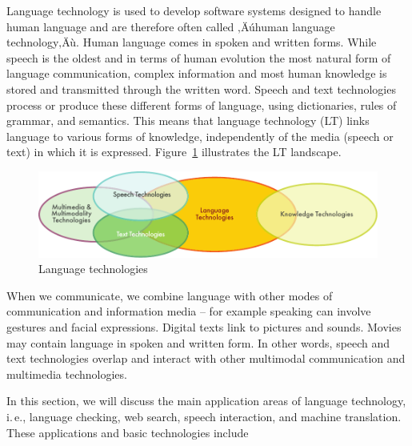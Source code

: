 \clearpage


\begin{multicols}{2}

  Language technology is used to develop software systems designed to
  handle human language and are therefore often called ‚Äúhuman language
  technology‚Äù. Human language comes in spoken and written forms. While
  speech is the oldest and in terms of human evolution the most
  natural form of language communication, complex information and most
  human knowledge is stored and transmitted through the written
  word. Speech and text technologies process or produce these
  different forms of language, using dictionaries, rules of grammar,
  and semantics. This means that language technology (LT) links
  language to various forms of knowledge, independently of the media
  (speech or text) in which it is
  expressed. Figure~\ref{fig:ltincontext_en} illustrates the LT
  landscape.

\begin{figure}[htb]
  \center
  \includegraphics[width=\textwidth]{../_media/english/language_technologies}
  \caption{Language technologies}
\label{fig:ltincontext_en}
\end{figure}

When we communicate, we combine language with other modes of communication and
information media -- for example speaking can involve gestures and facial
expressions. Digital texts link to pictures and sounds. Movies may contain
language in spoken and written form. In other words, speech and text
technologies overlap and interact with other multimodal communication and
multimedia technologies.

In this section, we will discuss the main application areas of language
technology, i.\,e., language checking, web search, speech interaction, and
machine translation. These applications and basic technologies include 


\end{multicols}
